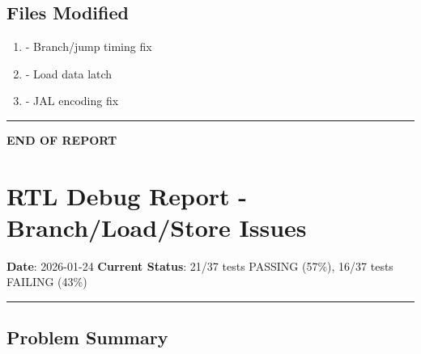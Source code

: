 \subsection{\texorpdfstring{\notemark{} Files
Modified}{ Files Modified}}\label{cr:fix:rtl-bug-fixes:pencil-files-modified}

\begin{record}

\begin{enumerate}
\def\labelenumi{\arabic{enumi}.}
\tightlist
\item
   - Branch/\allowbreak{}jump timing
  fix
\item
   - Load data latch
\item
   - JAL encoding fix
\end{enumerate}

\begin{center}\rule{0.5\linewidth}{0.5pt}\end{center}

\textbf{END OF REPORT}

\end{record}

\section{\texorpdfstring{RTL Debug Report -
Branch/\allowbreak{}Load/\allowbreak{}Store
Issues}{RTL Debug Report - Branch/Load/Store Issues}}\label{cr:fix:rtl-debug-report}

\begin{record}

\textbf{Date}: 2026-01-24 \textbf{Current Status}: 21/37 tests PASSING
(57\%), 16/37 tests FAILING (43\%)

\begin{center}\rule{0.5\linewidth}{0.5pt}\end{center}

\end{record}

\subsection{Problem Summary}\label{cr:fix:rtl-debug-report:problem-summary}

